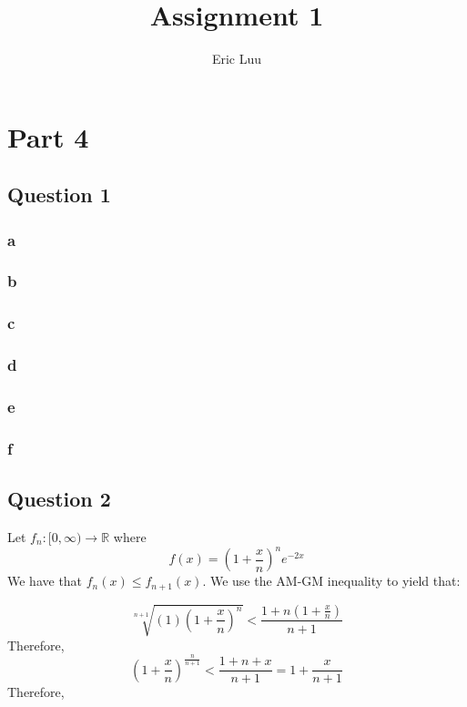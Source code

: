 \documentclass{article}
\title{Assignment 1}
\author{Eric Luu}
\theoremstyle{definition}
\numberwithin{theorem}{section}
\numberwithin{equation}{section}
\begin{document}
\maketitle
\section*{Part 4}
\subsection*{Question 1}

\subsubsection*{a}

\subsubsection*{b}

\subsubsection*{c}

\subsubsection*{d}

\subsubsection*{e}

\subsubsection*{f}

\subsection*{Question 2}

Let $f_n : [0, \infty) \rightarrow \mathbb{R}$ where
\begin{equation}
	f(x) = \left( 1 + \frac{x}{n}\right)^n e^{-2x}
\end{equation}
We have that $f_n(x) \leq f_{n+1}(x)$. We use the AM-GM inequality to yield that:

\begin{equation}
	\sqrt[n + 1]{(1) \left( 1 + \frac{x}{n}\right)^n} < \frac{1 + n \left( 1 + \frac{x}{n}\right)}{n + 1}
\end{equation}
Therefore,
\begin{equation}
	\left( 1 + \frac{x}{n}\right)^{\frac{n}{n + 1}} < \frac{1 + n + x}{n + 1} = 1 + \frac{x}{n + 1}
\end{equation}
Therefore,
\end{document}
